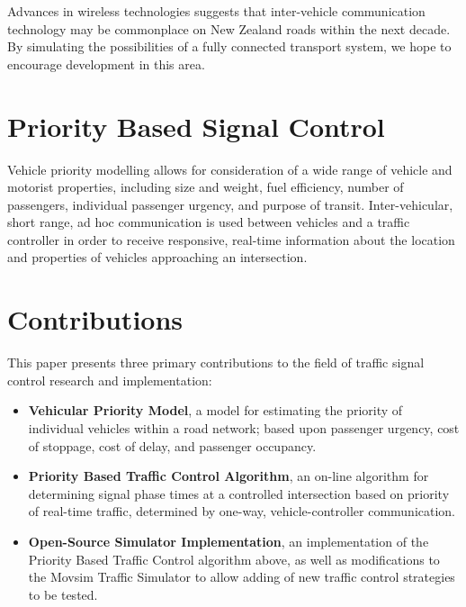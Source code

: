 Advances in wireless technologies suggests that inter-vehicle communication technology may be commonplace on New Zealand roads within the next decade. By simulating the possibilities of a fully connected transport system, we hope to encourage development in this area.

\section{Priority Based Signal Control}

Vehicle priority modelling allows for consideration of a wide range of vehicle and motorist properties, including size and weight, fuel efficiency, number of passengers, individual passenger urgency, and purpose of transit. Inter-vehicular, short range, ad hoc communication is used between vehicles and a traffic controller in order to receive responsive, real-time information about the location and properties of vehicles approaching an intersection. 

\section{Contributions}

This paper presents three primary contributions to the field of traffic signal control research and implementation:

\begin{itemize}
\item \textbf{Vehicular Priority Model}, a model for estimating the priority of individual vehicles within a road network; based upon passenger urgency, cost of stoppage, cost of delay, and passenger occupancy.
\item \textbf{Priority Based Traffic Control Algorithm}, an on-line algorithm for determining signal phase times at a controlled intersection based on priority of real-time traffic, determined by one-way, vehicle-controller communication. 
\item \textbf{Open-Source Simulator Implementation}, an implementation of the Priority Based Traffic Control algorithm above, as well as modifications to the Movsim Traffic Simulator to allow adding of new traffic control strategies to be tested.
\end{itemize}




